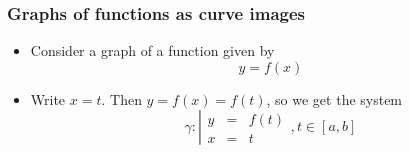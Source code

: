 \begin{frame}
\frametitle{Graphs of functions as curve images}
\begin{itemize}
\item Consider a graph of a function given by 
\[
y=f(x)
\]
\item<2-> Write $x=t$. Then $y=f(x)=f(t)$, so we get the system 
\[
\gamma: \left|\begin{array}{rcl}
y&=&f(t)\\
x&=&t
\end{array}\right., t\in [a,b]
\]
\end{itemize}
\end{frame}

